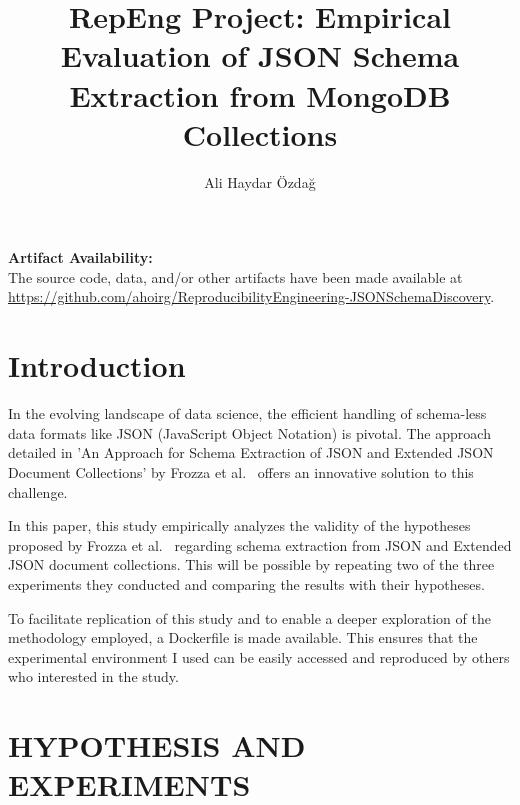 \documentclass[sigconf, nonacm]{acmart}
\begin{document}
\title{RepEng Project:  Empirical Evaluation of JSON Schema Extraction from MongoDB Collections}


\author{Ali Haydar Özdağ}


\maketitle

\vspace{.3cm}
\begingroup\small\noindent\raggedright\textbf{Artifact Availability:}\\
The source code, data, and/or other artifacts have been made available at \url{https://github.com/ahoirg/ReproducibilityEngineering-JSONSchemaDiscovery}.
\endgroup


\section{Introduction}

In the evolving landscape of data science, the efficient handling of schema-less data formats like JSON (JavaScript Object Notation) is pivotal. The approach detailed in 'An Approach for Schema Extraction of JSON and Extended JSON Document Collections' by Frozza et al.~\cite{SchemaExtraction} offers an innovative solution to this challenge.

In this paper, this study empirically analyzes the validity of the hypotheses proposed by Frozza et al.~\cite{SchemaExtraction} regarding schema extraction from JSON and Extended JSON document collections. This will be possible by repeating two of the three experiments they conducted and comparing the results with their hypotheses.

To facilitate replication of this study and to enable a deeper exploration of the methodology employed, a Dockerfile is made available. This ensures that the experimental environment I used can be easily accessed and reproduced by others who interested in the study.

\section{HYPOTHESIS AND EXPERIMENTS}
\end{document}
